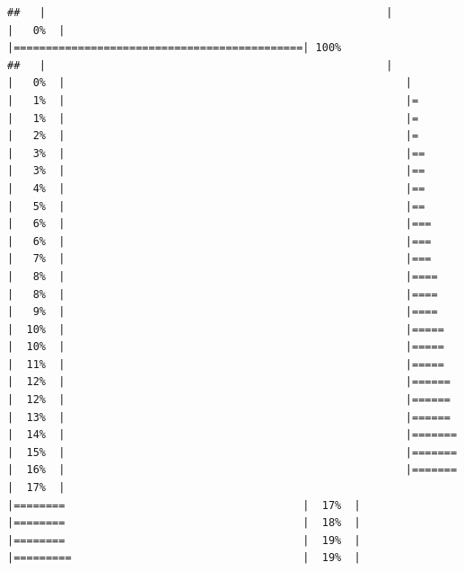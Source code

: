 \documentclass[
  krantz2]{krantz}
\begin{document}
\begin{verbatim}
##   |                                                     |                                             |   0%  |                                                     |=============================================| 100%
##   |                                                     |                                             |   0%  |                                                     |                                             |   1%  |                                                     |=                                            |   1%  |                                                     |=                                            |   2%  |                                                     |=                                            |   3%  |                                                     |==                                           |   3%  |                                                     |==                                           |   4%  |                                                     |==                                           |   5%  |                                                     |==                                           |   6%  |                                                     |===                                          |   6%  |                                                     |===                                          |   7%  |                                                     |===                                          |   8%  |                                                     |====                                         |   8%  |                                                     |====                                         |   9%  |                                                     |====                                         |  10%  |                                                     |=====                                        |  10%  |                                                     |=====                                        |  11%  |                                                     |=====                                        |  12%  |                                                     |======                                       |  12%  |                                                     |======                                       |  13%  |                                                     |======                                       |  14%  |                                                     |=======                                      |  15%  |                                                     |=======                                      |  16%  |                                                     |=======                                      |  17%  |                                                     |========                                     |  17%  |                                                     |========                                     |  18%  |                                                     |========                                     |  19%  |                                                     |=========                                    |  19%  |     
\end{verbatim}
\end{document}
